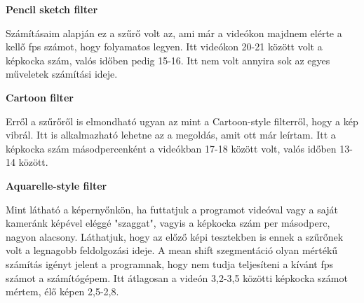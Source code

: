 \textbf{Pencil sketch filter}

Számításaim alapján ez a szűrő volt az, ami már a videókon majdnem elérte a kellő fps számot, hogy folyamatos legyen. Itt videókon 20-21 között volt a képkocka szám, valós időben pedig 15-16. Itt nem volt annyira sok az egyes műveletek számítási ideje.

\textbf{Cartoon filter}

Erről a szűrőről is elmondható ugyan az mint a Cartoon-style filterről, hogy a kép vibrál. Itt is alkalmazható lehetne az a megoldás, amit ott már leírtam. Itt a képkocka szám másodpercenként a videókban 17-18 között volt, valós időben 13-14 között.

\textbf{Aquarelle-style filter}

Mint látható a képernyőnkön, ha futtatjuk a programot videóval vagy a saját kameránk képével eléggé "szaggat", vagyis a képkocka szám per másodperc, nagyon alacsony. Láthatjuk, hogy az előző képi tesztekben is ennek a szűrőnek volt a legnagobb feldolgozási ideje. A mean shift szegmentáció olyan mértékű számítás igényt jelent a programnak, hogy nem tudja teljesíteni a kívánt fps számot a számítógépem. Itt átlagosan a videón 3,2-3,5 közötti képkocka számot mértem, élő képen 2,5-2,8.

